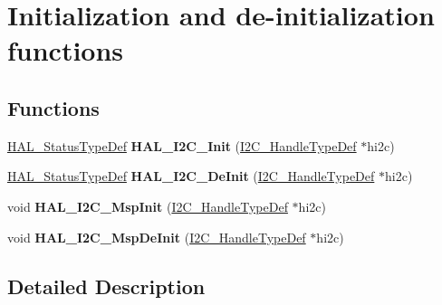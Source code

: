 \hypertarget{group___i2_c___exported___functions___group1}{}\section{Initialization and de-\/initialization functions}
\label{group___i2_c___exported___functions___group1}
\subsection*{Functions}
\begin{DoxyCompactItemize}
\item 
\mbox{\label{group___i2_c___exported___functions___group1_ga9d29159a6da072287fff73743fd93260}} 
\hyperlink{stm32f0xx__hal__def_8h_a63c0679d1cb8b8c684fbb0632743478f}{H\+A\+L\+\_\+\+Status\+Type\+Def} {\bfseries H\+A\+L\+\_\+\+I2\+C\+\_\+\+Init} (\hyperlink{struct_____i2_c___handle_type_def}{I2\+C\+\_\+\+Handle\+Type\+Def} $\ast$hi2c)
\item 
\mbox{\label{group___i2_c___exported___functions___group1_gabda634ba18f874775d1262c887d273b4}} 
\hyperlink{stm32f0xx__hal__def_8h_a63c0679d1cb8b8c684fbb0632743478f}{H\+A\+L\+\_\+\+Status\+Type\+Def} {\bfseries H\+A\+L\+\_\+\+I2\+C\+\_\+\+De\+Init} (\hyperlink{struct_____i2_c___handle_type_def}{I2\+C\+\_\+\+Handle\+Type\+Def} $\ast$hi2c)
\item 
\mbox{\label{group___i2_c___exported___functions___group1_gabe01a202c27b23fc150aa66af3130073}} 
void {\bfseries H\+A\+L\+\_\+\+I2\+C\+\_\+\+Msp\+Init} (\hyperlink{struct_____i2_c___handle_type_def}{I2\+C\+\_\+\+Handle\+Type\+Def} $\ast$hi2c)
\item 
\mbox{\label{group___i2_c___exported___functions___group1_ga2ec8d9b09854c732e2feed549278f048}} 
void {\bfseries H\+A\+L\+\_\+\+I2\+C\+\_\+\+Msp\+De\+Init} (\hyperlink{struct_____i2_c___handle_type_def}{I2\+C\+\_\+\+Handle\+Type\+Def} $\ast$hi2c)
\end{DoxyCompactItemize}


\subsection{Detailed Description}
